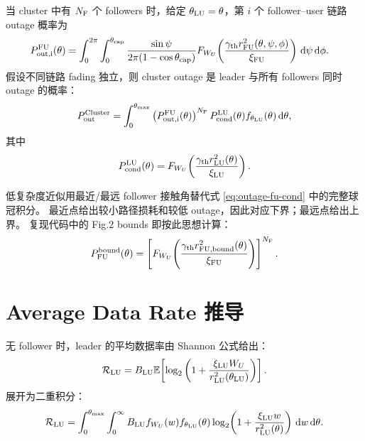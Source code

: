 \documentclass[UTF8,a4paper,11pt]{ctexart}
\newcommand{\thetac}{\theta_{\rm cap}}
\newcommand{\thetam}{\theta_{\max}}
\newcommand{\NF}{N_{\rm F}}
\newcommand{\E}{\mathbb{E}}
\newcommand{\dd}{\,{\rm d}}
\newcommand{\rLU}{r_{\rm LU}}
\newcommand{\rFU}{r_{\rm FU}}
\newcommand{\RLU}{\mathcal{R}_{\rm LU}}
\begin{document}
当 cluster 中有 $\NF$ 个 followers 时，给定 $\theta_{\rm LU}=\theta$，第 $i$ 个
follower--user 链路 outage 概率为
\begin{equation}
\begin{aligned}
P_{\rm out,i}^{\rm FU}(\theta)
&=
\int_{0}^{2\pi}\int_{0}^{\thetac}
\frac{\sin\psi}{2\pi(1-\cos\thetac)}
F_{W_U}\!\left(
\frac{\gamma_{\rm th}\rFU^2(\theta,\psi,\phi)}{\xi_{\rm FU}}
\right)
\dd\psi\dd\phi .
\end{aligned}
\label{eq:outage-fu-cond}
\end{equation}
假设不同链路 fading 独立，则 cluster outage 是 leader 与所有 followers
同时 outage 的概率：
\begin{equation}
    P_{\rm out}^{\rm Cluster}
    =
    \int_{0}^{\thetam}
    \left(P_{\rm out,i}^{\rm FU}(\theta)\right)^{\NF}
    P_{\rm cond}^{\rm LU}(\theta)
    f_{\theta_{\rm LU}}(\theta)\dd\theta ,
    \label{eq:outage-cluster}
\end{equation}
其中
\begin{equation}
    P_{\rm cond}^{\rm LU}(\theta)
    =
    F_{W_U}\!\left(\frac{\gamma_{\rm th}\rLU^2(\theta)}{\xi_{\rm LU}}\right).
\end{equation}

低复杂度近似用最近/最远 follower 接触角替代式 \eqref{eq:outage-fu-cond} 中的完整球冠积分。
最近点给出较小路径损耗和较低 outage，因此对应下界；最远点给出上界。
复现代码中的 Fig.2 bounds 即按此思想计算：
\begin{equation}
    P_{\rm FU}^{\rm bound}(\theta)
    =
    \left[
    F_{W_U}\!\left(
    \frac{\gamma_{\rm th}r_{\rm FU,bound}^2(\theta)}
    {\xi_{\rm FU}}
    \right)
    \right]^{\NF}.
\end{equation}

\section{Average Data Rate 推导}

无 follower 时，leader 的平均数据率由 Shannon 公式给出：
\begin{equation}
    \RLU =
    B_{\rm LU}\E\!\left[
    \log_2\left(1+\frac{\xi_{\rm LU}W_U}{\rLU^2(\theta_{\rm LU})}\right)
    \right].
\end{equation}
展开为二重积分：
\begin{equation}
    \RLU =
    \int_{0}^{\thetam}\int_{0}^{\infty}
    B_{\rm LU} f_{W_U}(w) f_{\theta_{\rm LU}}(\theta)
    \log_2\!\left(1+\frac{\xi_{\rm LU}w}{\rLU^2(\theta)}\right)
    \dd w\dd\theta .
    \label{eq:rate-leader}
\end{equation}
\end{document}
